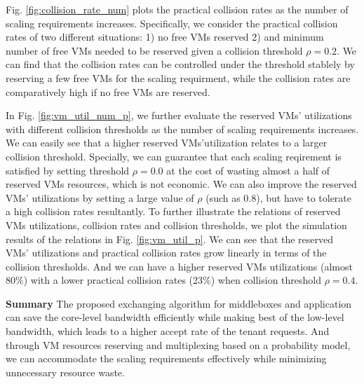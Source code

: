 \documentclass[review]{elsarticle}
\begin{document}
Fig. \ref{fig:collision_rate_num} plots the practical collision rates as the number of scaling requirements increases. Specifically, we consider the practical collision rates of two different situations: 1) no free VMs reserved 2) and minimum number of free VMs needed to be reserved given a collision threshold $\rho=0.2$. We can find that the collision rates can be controlled under the threshold stablely by reserving a few free VMs for the scaling requirment, while the collision rates are comparatively high if no free VMs are reserved. 

In Fig. \ref{fig:vm_util_num_p}, we further evaluate the reserved VMs' utilizations with different collision thresholds as the number of scaling requirements increases. We can easily see that a higher reserved VMs'utilization relates to a larger collision threshold. Specially, we can guarantee that each scaling reqirement is satisfied by setting threshold $\rho=0.0$ at the cost of wasting almost a half of reserved VMs resources, which is not economic. We can also improve the reserved VMs' utilizations by setting a large value of $\rho$ (such as 0.8), but have to tolerate a high collision rates resultantly. To further illustrate the relations of reserved VMs utilizations, collision rates and collision thresholds, we plot the simulation results of the relations in Fig. \ref{fig:vm_util_p}.
We can see that the reserved VMs' utilizations and practical collision rates grow linearly in terms of the collision thresholds. And we can have a higher reserved VMs utilizations (almost 80\%) with a lower practical collision rates (23\%) when collision threshold $\rho=0.4$. 

\textbf{Summary}
The proposed exchanging algorithm for middleboxes and application can save the core-level bandwidth efficiently while making best of the low-level bandwidth, which leads to a higher accept rate of the tenant requests. And through VM resources reserving and multiplexing based on a probability model, we can accommodate the scaling requirements effectively while minimizing unnecessary resource waste.  
\end{document}
